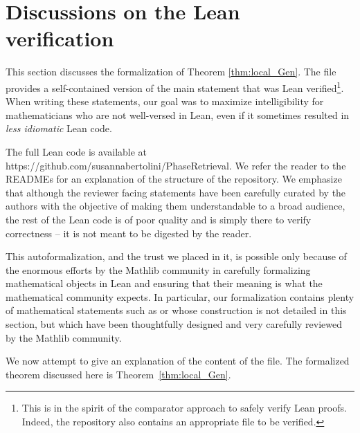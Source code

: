 \documentclass[11pt]{amsart}
\theoremstyle{remark}
\begin{document}
\section{Discussions on the Lean verification}\label{App}
This section discusses the formalization of Theorem \ref{thm:local_Gen}. The file   provides a self-contained version of the main statement that was Lean verified\footnote{This is in the spirit of the comparator approach \cite{LeanComparator}
to safely verify Lean proofs. Indeed, the repository also contains an appropriate  file to be verified.}. When writing these statements, our goal was to maximize intelligibility for mathematicians who are not well-versed in Lean, even if it sometimes resulted in \emph{less idiomatic} Lean code.  \vspace{0.5em}

The full Lean code is available at https://github.com/susannabertolini/PhaseRetrieval. We refer the reader to the READMEs for an explanation of the  structure of the repository. We emphasize that although the reviewer facing statements have been carefully curated by the authors with the objective of making them understandable to a broad audience, the rest of the Lean code is of poor quality and is simply there to verify correctness -- it is not meant to be digested by the reader. \vspace{0.5em}

This autoformalization, and the trust we placed in it, is possible only because of the enormous efforts by the Mathlib community \cite{mathlib2020} in carefully formalizing mathematical objects in Lean and ensuring that their meaning is what the mathematical community expects.  In particular, our formalization contains plenty of mathematical statements such as  or  whose construction is not detailed in this section, but which have been thoughtfully designed and very carefully reviewed by the Mathlib community. \vspace{0.5em}

We now attempt to give an explanation of the content of the  file.  The
formalized theorem discussed here is 
Theorem~\ref{thm:local_Gen}.  \vspace{0.5em}  %


\theoremstyle{plain}
\newtheorem*{theorem*}{Theorem}
\end{document}

